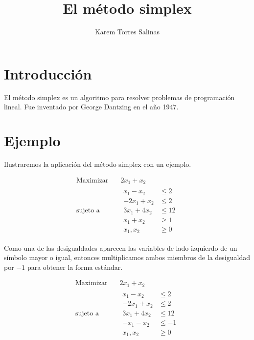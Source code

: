 \documentclass{article}
\title{El método simplex}
\author{Karem Torres Salinas}
\begin{document}
\maketitle

\section{Introducción}
\label{sec:introduccion}
El método simplex es un algoritmo para resolver problemas de
programación lineal. Fue inventado por George Dantzing en el año 1947.

\section{Ejemplo}
\label{sec:ejemplo}

Ilustraremos la aplicación del método simplex con un ejemplo.

\begin{equation*}
 \begin{aligned}
\text{Maximizar} \quad & 2x_{1}+x_{2}\\
\text{sujeto a} \quad &
  \begin{aligned}
   x_{1}-x_{2} &\leq 2\\
   -2x_{1}+x_{2} &\leq 2\\
   3x_{1}+4x_{2} &\leq 12\\
   x_{1}+x_{2} &\geq 1\\
    x_{1},x_{2} &\geq 0
  \end{aligned}
\end{aligned}
\end{equation*}

Como una de las desigualdades aparecen las variables de lado izquierdo
de un símbolo mayor o igual, entonces multiplicamos ambos miembros de
la desigualdad por $-1$ para obtener la forma estándar.


\begin{equation*}
 \begin{aligned}
\text{Maximizar} \quad & 2x_{1}+x_{2}\\
\text{sujeto a} \quad &
  \begin{aligned}
   x_{1}-x_{2} &\leq 2\\
   -2x_{1}+x_{2} &\leq 2\\
   3x_{1}+4x_{2} &\leq 12\\
  - x_{1}-x_{2} &\leq -1\\
    x_{1},x_{2} &\geq 0
  \end{aligned}
\end{aligned}
\end{equation*}
\end{document}

